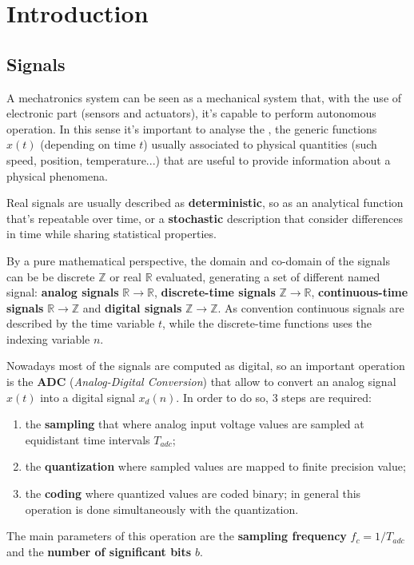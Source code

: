 \chapter{Introduction}
	
\section*{Signals}
	A mechatronics system can be seen as a mechanical system that, with the use of electronic part (sensors and actuators), it's capable to perform autonomous operation. In this sense it's important to analyse the , the generic functions $x(t)$ (depending on time $t$) usually associated to physical quantities (such speed, position, temperature...) that are useful to provide information about a physical phenomena.
	
	Real signals are usually described as \textbf{deterministic}, so as an analytical function that's repeatable over time, or a \textbf{stochastic} description that consider differences in time while sharing statistical properties.
	
	By a pure mathematical perspective, the domain and co-domain of the signals can be be discrete $\mathds Z$ or real $\mathds R$ evaluated, generating a set of different named signal: \textbf{analog signals} $\mathds R \rightarrow \mathds R$, \textbf{discrete-time signals} $\mathds Z \rightarrow \mathds R$, \textbf{continuous-time signals} $\mathds R \rightarrow \mathds Z$ and \textbf{digital signals} $\mathds Z \rightarrow \mathds Z$. As convention continuous signals are described by the time variable $t$, while the discrete-time functions uses the indexing variable $n$. \vspace{3mm}
	
	Nowadays most of the signals are computed as digital, so an important operation is the \textbf{ADC} (\textit{Analog-Digital Conversion}) that allow to convert an analog signal $x(t)$ into a digital signal $x_d(n)$. In order to do so, 3 steps are required:
	\begin{enumerate}
		\item the \textbf{sampling} that where analog input voltage values are sampled at equidistant time intervals $T_{adc}$;
		\item the \textbf{quantization} where sampled values are mapped to finite precision value;
		\item the \textbf{coding} where quantized values are coded binary; in general this operation is done simultaneously with the quantization.
	\end{enumerate}
	The main parameters of this operation are the \textbf{sampling frequency} $f_c = 1 / T_{adc}$ and the \textbf{number of significant bits} $b$.	
	
